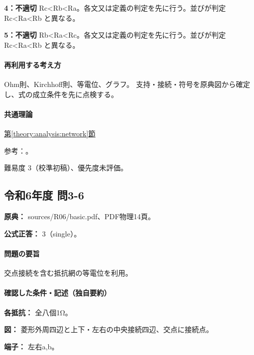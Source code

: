 \noindent\textbf{4：不適切} Rc<Rb<Ra。各文又は定義の判定を先に行う。並びが判定 Rc<Ra<Rb と異なる。\par

\noindent\textbf{5：不適切} Rb<Ra<Rc。各文又は定義の判定を先に行う。並びが判定 Rc<Ra<Rb と異なる。\par

\paragraph{再利用する考え方} Ohm則、Kirchhoff則、等電位、グラフ。 支持・接続・符号を原典図から確定し、式の成立条件を先に点検する。

\paragraph{共通理論} \hyperref[theory:analysis:network]{第\ref*{theory:analysis:network}節}

\par 参考：\cite{analysis57_resistors}。

\par 難易度 3（校準初稿）、優先度未評価。

\subsection{令和6年度 問3-6}
\label{q:r06-reg-basic-3-6}

\noindent\textbf{原典：} sources/R06/basic.pdf、PDF物理14頁。

\textbf{公式正答：} 3（single）。

\paragraph{問題の要旨} 交点接続を含む抵抗網の等電位を利用。

\paragraph{確認した条件・記述（独自要約）}\mbox{}\par

\noindent\textbf{各抵抗：} 全八個1Ω。\par

\noindent\textbf{図：} 菱形外周四辺と上下・左右の中央接続四辺、交点に接続点。\par

\noindent\textbf{端子：} 左右a,b。\par

